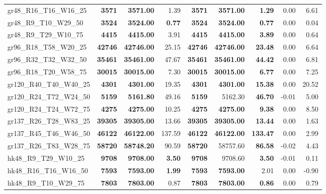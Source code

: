 \documentclass{singlecol-new}
\begin{document}
\begin{scriptsize}
\begin{longtable}{lrrrrrrrr}
		gr48\_R16\_T16\_W16\_25 & \textbf{3571} & \textbf{3571.00} & 1.39 & \textbf{3571} & \textbf{3571.00} & \textbf{1.29} & 0.00 & 6.61 \\
		gr48\_R9\_T10\_W29\_50 & \textbf{3524} & \textbf{3524.00} & \textbf{0.77} & \textbf{3524} & \textbf{3524.00} & \textbf{0.77} & 0.00 & 0.04 \\
		gr48\_R9\_T29\_W10\_75 & \textbf{4415} & \textbf{4415.00} & 3.91 & \textbf{4415} & \textbf{4415.00} & \textbf{3.89} & 0.00 & 0.64 \\
		gr96\_R18\_T58\_W20\_25 & \textbf{42746} & \textbf{42746.00} & 25.15 & \textbf{42746} & \textbf{42746.00} & \textbf{23.48} & 0.00 & 6.64 \\
		gr96\_R32\_T32\_W32\_50 & \textbf{35461} & \textbf{35461.00} & 47.67 & \textbf{35461} & \textbf{35461.00} & \textbf{44.42} & 0.00 & 6.81 \\
		gr96\_R18\_T20\_W58\_75 & \textbf{30015} & \textbf{30015.00} & 7.30 & \textbf{30015} & \textbf{30015.00} & \textbf{6.77} & 0.00 & 7.25 \\
		gr120\_R40\_T40\_W40\_25 & \textbf{4301} & \textbf{4301.00} & 19.35 & \textbf{4301} & \textbf{4301.00} & \textbf{15.38} & 0.00 & 20.52 \\
		gr120\_R24\_T72\_W24\_50 & \textbf{5159} & \textbf{5161.80} & 49.16 & \textbf{5159} & 5162.30 & \textbf{46.70} & -0.01 & 5.00 \\
		gr120\_R24\_T24\_W72\_75 & \textbf{4275} & \textbf{4275.00} & 10.25 & \textbf{4275} & \textbf{4275.00} & \textbf{9.38} & 0.00 & 8.50 \\
		gr137\_R26\_T28\_W83\_25 & \textbf{39305} & \textbf{39305.00} & 13.66 & \textbf{39305} & \textbf{39305.00} & \textbf{13.44} & 0.00 & 1.63 \\
		gr137\_R45\_T46\_W46\_50 & \textbf{46122} & \textbf{46122.00} & 137.59 & \textbf{46122} & \textbf{46122.00} & \textbf{133.47} & 0.00 & 2.99 \\
		gr137\_R26\_T83\_W28\_75 & \textbf{58720} & \textbf{58748.20} & 90.59 & \textbf{58720} & 58757.60 & \textbf{86.58} & -0.02 & 4.43 \\
		hk48\_R9\_T29\_W10\_25 & \textbf{9708} & \textbf{9708.00} & \textbf{3.50} & \textbf{9708} & 9708.60 & \textbf{3.50} & -0.01 & 0.11 \\
		hk48\_R16\_T16\_W16\_50 & \textbf{7593} & \textbf{7593.00} & \textbf{1.99} & \textbf{7593} & \textbf{7593.00} & 2.01 & 0.00 & -0.90 \\
		hk48\_R9\_T10\_W29\_75 & \textbf{7803} & \textbf{7803.00} & 0.87 & \textbf{7803} & \textbf{7803.00} & \textbf{0.86} & 0.00 & 0.79 \\

\end{longtable}
\end{scriptsize}
\end{document}
